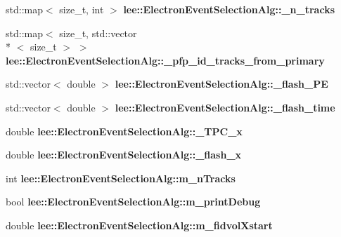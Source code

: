 \begin{DoxyCompactItemize}
\item 
\hypertarget{group__lee_gaed017ee63fe451fd266d9b16c9cf8d3c}{std\-::map$<$ size\-\_\-t, int $>$ {\bfseries lee\-::\-Electron\-Event\-Selection\-Alg\-::\-\_\-n\-\_\-tracks}}\label{group__lee_gaed017ee63fe451fd266d9b16c9cf8d3c}

\item 
\hypertarget{group__lee_ga5f8d5c0400bf9f2a5963a70615a04f7f}{std\-::map$<$ size\-\_\-t, std\-::vector\\*
$<$ size\-\_\-t $>$ $>$ {\bfseries lee\-::\-Electron\-Event\-Selection\-Alg\-::\-\_\-pfp\-\_\-id\-\_\-tracks\-\_\-from\-\_\-primary}}\label{group__lee_ga5f8d5c0400bf9f2a5963a70615a04f7f}

\item 
\hypertarget{group__lee_gace044c6f4da66c667ce2106cb82b9851}{std\-::vector$<$ double $>$ {\bfseries lee\-::\-Electron\-Event\-Selection\-Alg\-::\-\_\-flash\-\_\-\-P\-E}}\label{group__lee_gace044c6f4da66c667ce2106cb82b9851}

\item 
\hypertarget{group__lee_ga3b833533a073320eb3142149ce708e58}{std\-::vector$<$ double $>$ {\bfseries lee\-::\-Electron\-Event\-Selection\-Alg\-::\-\_\-flash\-\_\-time}}\label{group__lee_ga3b833533a073320eb3142149ce708e58}

\item 
\hypertarget{group__lee_ga8a52193b5a38db1f71b010b47f745b21}{double {\bfseries lee\-::\-Electron\-Event\-Selection\-Alg\-::\-\_\-\-T\-P\-C\-\_\-x}}\label{group__lee_ga8a52193b5a38db1f71b010b47f745b21}

\item 
\hypertarget{group__lee_ga323a6efba151edcc16bf3a13d575315e}{double {\bfseries lee\-::\-Electron\-Event\-Selection\-Alg\-::\-\_\-flash\-\_\-x}}\label{group__lee_ga323a6efba151edcc16bf3a13d575315e}

\item 
\hypertarget{group__lee_ga7037dd08a637555158a8575ddca0219b}{int {\bfseries lee\-::\-Electron\-Event\-Selection\-Alg\-::m\-\_\-n\-Tracks}}\label{group__lee_ga7037dd08a637555158a8575ddca0219b}

\item 
\hypertarget{group__lee_ga3efb31abe249ff0a0172df48454c4a01}{bool {\bfseries lee\-::\-Electron\-Event\-Selection\-Alg\-::m\-\_\-print\-Debug}}\label{group__lee_ga3efb31abe249ff0a0172df48454c4a01}

\item 
\hypertarget{group__lee_ga2bc56efdd67fed68ea859f9c31e92689}{double {\bfseries lee\-::\-Electron\-Event\-Selection\-Alg\-::m\-\_\-fidvol\-Xstart}}\label{group__lee_ga2bc56efdd67fed68ea859f9c31e92689}


\end{DoxyCompactItemize}
